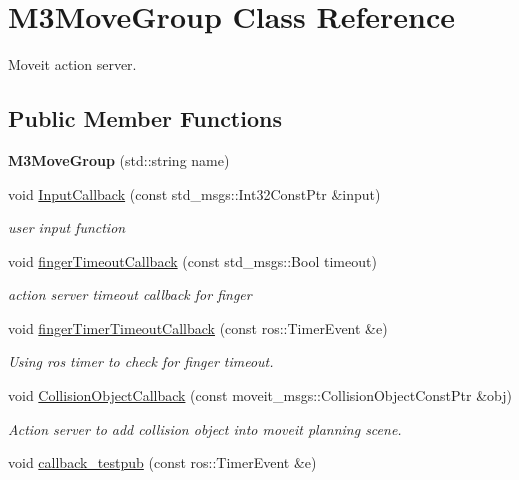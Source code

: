\hypertarget{classM3MoveGroup}{}\section{M3\+Move\+Group Class Reference}
\label{classM3MoveGroup}


Moveit action server.  


\subsection*{Public Member Functions}
\begin{DoxyCompactItemize}
\item 
\mbox{\label{classM3MoveGroup_aeb66c992c2a648e53f823a6058669c4c}} 
{\bfseries M3\+Move\+Group} (std\+::string name)
\item 
void \hyperlink{classM3MoveGroup_a0d53e8cfafd00e1a22f1cf5e091b63a1}{Input\+Callback} (const std\+\_\+msgs\+::\+Int32\+Const\+Ptr \&input)
\begin{DoxyCompactList}\small\item\em user input function \end{DoxyCompactList}\item 
void \hyperlink{classM3MoveGroup_a754821f89a28e5b3e6924d9f9e040946}{finger\+Timeout\+Callback} (const std\+\_\+msgs\+::\+Bool timeout)
\begin{DoxyCompactList}\small\item\em action server timeout callback for finger \end{DoxyCompactList}\item 
void \hyperlink{classM3MoveGroup_a78c1d36f86d5ade3dc73b6239227a512}{finger\+Timer\+Timeout\+Callback} (const ros\+::\+Timer\+Event \&e)
\begin{DoxyCompactList}\small\item\em Using ros timer to check for finger timeout. \end{DoxyCompactList}\item 
void \hyperlink{classM3MoveGroup_ada2b7b9e5a402676eff8747267385f6b}{Collision\+Object\+Callback} (const moveit\+\_\+msgs\+::\+Collision\+Object\+Const\+Ptr \&obj)
\begin{DoxyCompactList}\small\item\em Action server to add collision object into moveit planning scene. \end{DoxyCompactList}\item 
void \hyperlink{classM3MoveGroup_a9b982c9f3cd26755ed9b6ecca1286c50}{callback\+\_\+testpub} (const ros\+::\+Timer\+Event \&e)

\end{DoxyCompactItemize}
